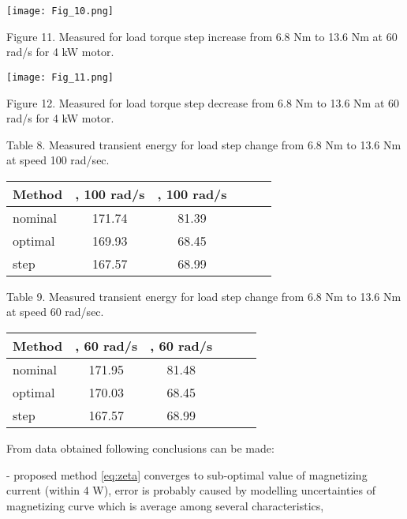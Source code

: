 \documentclass[journal]{IEEEtran}
\begin{document}
\begin{center}
\ifpdf \texttt{[image: Fig\_10.png]}
\fi

Figure 11. Measured  for load torque step increase from 6.8 Nm to 13.6 Nm at 60 rad/s for 4 kW motor.
\end{center}

\begin{center}
\ifpdf \texttt{[image: Fig\_11.png]}
\fi

Figure 12. Measured  for load torque step decrease from 6.8 Nm to 13.6 Nm at 60 rad/s for 4 kW motor.
\end{center}

\begin{center}
Table 8.
Measured transient energy for load step change from 6.8 Nm to 13.6 Nm at speed 100 rad/sec.

\begin{tabular}{ | l | c | c | c | c | c | }
\hline 
Method & , 100 rad/s & , 100 rad/s \\
\hline 
nominal & 171.74  & 81.39   \\
optimal & 169.93  & 68.45  \\
step & 167.57  &  68.99  \\
\hline 
\end{tabular}

\end{center}

\begin{center}
Table 9.
Measured transient energy for load step change from 6.8 Nm to 13.6 Nm at speed 60 rad/sec.

\begin{tabular}{ | l | c | c | c | c | c | }
\hline 
Method & , 60 rad/s & , 60 rad/s \\
\hline 
nominal & 171.95  & 81.48   \\
optimal & 170.03  & 68.45  \\
step & 167.57  & 68.99   \\
\hline 
\end{tabular}

\end{center}


From data obtained following conclusions can be made:

- proposed method \eqref{eq:zeta} converges to sub-optimal value of magnetizing current  (within 4 W), error is probably caused by modelling uncertainties of magnetizing curve which is average among several characteristics,
\end{document}
